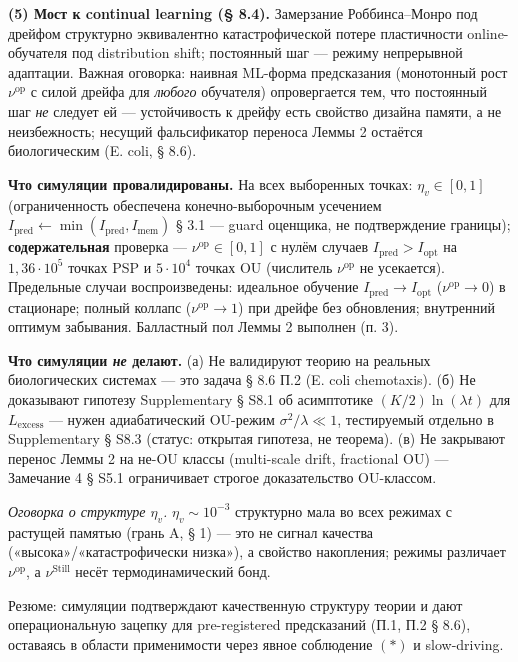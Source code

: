 \documentclass[pdflatex,sn-mathphys-ay]{sn-jnl}
\begin{document}
\textbf{(5) Мост к continual learning (§ 8.4).} Замерзание Роббинса--Монро под дрейфом структурно эквивалентно катастрофической потере пластичности online-обучателя под distribution shift; постоянный шаг --- режиму непрерывной адаптации. Важная оговорка: наивная ML-форма предсказания (монотонный рост \(\nu^{\text{op}}\) с силой дрейфа для \emph{любого} обучателя) опровергается тем, что постоянный шаг \emph{не} следует ей --- устойчивость к дрейфу есть свойство дизайна памяти, а не неизбежность; несущий фальсификатор переноса Леммы 2 остаётся биологическим (E. coli, § 8.6).



\textbf{Что симуляции провалидированы.} На всех выборенных точках: \(\eta_v \in [0,1]\) (ограниченность обеспечена конечно-выборочным усечением \(I_{\text{pred}} \gets \min(I_{\text{pred}}, I_{\text{mem}})\) § 3.1 --- guard оценщика, не подтверждение границы); \textbf{содержательная} проверка --- \(\nu^{\text{op}} \in [0,1]\) с нулём случаев \(I_{\text{pred}} > I_{\text{opt}}\) на \(1{,}36 \cdot 10^5\) точках PSP и \(5 \cdot 10^4\) точках OU (числитель \(\nu^{\text{op}}\) не усекается). Предельные случаи воспроизведены: идеальное обучение \(I_{\text{pred}} \to I_{\text{opt}}\) (\(\nu^{\text{op}} \to 0\)) в стационаре; полный коллапс (\(\nu^{\text{op}} \to 1\)) при дрейфе без обновления; внутренний оптимум забывания. Балластный пол Леммы 2 выполнен (п. 3).



\textbf{Что симуляции \emph{не} делают.} (а) Не валидируют теорию на реальных биологических системах --- это задача § 8.6 П.2 (E. coli chemotaxis). (б) Не доказывают гипотезу Supplementary § S8.1 об асимптотике \((K/2)\ln(\lambda t)\) для \(L_{\text{excess}}\) --- нужен адиабатический OU-режим \(\sigma^2/\lambda \ll 1\), тестируемый отдельно в Supplementary § S8.3 (статус: открытая гипотеза, не теорема). (в) Не закрывают перенос Леммы 2 на не-OU классы (multi-scale drift, fractional OU) --- Замечание 4 § S5.1 ограничивает строгое доказательство OU-классом.



\emph{Оговорка о структуре \(\eta_v\).} \(\eta_v \sim 10^{-3}\) структурно мала во всех режимах с растущей памятью (грань A, § 1) --- это не сигнал качества («высока»/«катастрофически низка»), а свойство накопления; режимы различает \(\nu^{\text{op}}\), а \(\nu^{\text{Still}}\) несёт термодинамический бонд.



Резюме: симуляции подтверждают качественную структуру теории и дают операциональную зацепку для pre-registered предсказаний (П.1, П.2 § 8.6), оставаясь в области применимости через явное соблюдение \((*)\) и slow-driving.
\end{document}
